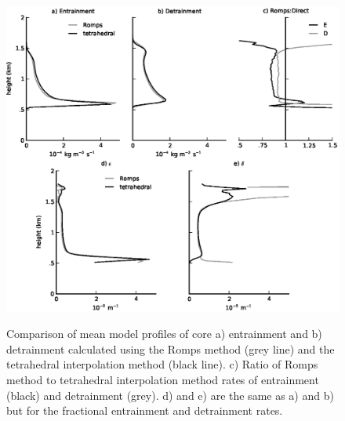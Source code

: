 \documentclass[12pt]{article}
\begin{document}
\begin{figure}[t]
  \noindent
  \includegraphics[width=40pc,angle=0]{./figures/direct_vs_romps}\\
  \caption{Comparison of mean model profiles of core a) entrainment and b) 
  detrainment calculated using the Romps method (grey line) and the
  tetrahedral interpolation method (black line).  c) Ratio of Romps 
  method to tetrahedral interpolation method rates of entrainment 
  (black) and detrainment (grey).  d) and e) are the same as a) and b) but 
  for the fractional entrainment and detrainment rates.}
  \label{fig:direct_vs_romps}
\end{figure}
\end{document}
